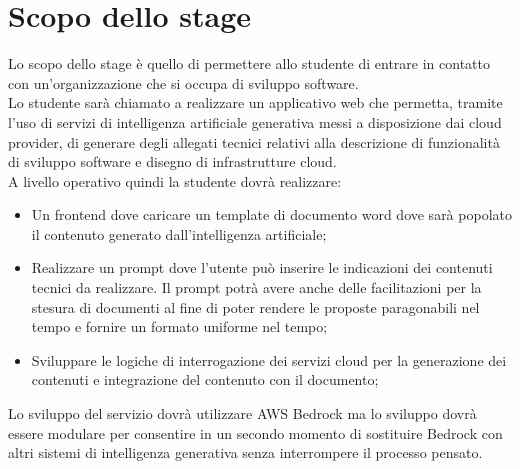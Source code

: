 \section*{Scopo dello stage}
Lo scopo dello stage è quello di permettere allo studente di entrare in contatto con un’organizzazione che si occupa di sviluppo software.\\

Lo studente sarà chiamato a realizzare un applicativo web che permetta, tramite l’uso di servizi di intelligenza artificiale generativa messi a disposizione dai cloud provider, di generare degli allegati tecnici relativi alla descrizione di funzionalità di sviluppo software e disegno di infrastrutture cloud. \\

A livello operativo quindi la studente dovrà realizzare:
\begin{itemize}
    \item Un frontend dove caricare un template di documento word dove sarà popolato il contenuto generato dall’intelligenza artificiale;
    \item Realizzare un prompt dove l’utente può inserire le indicazioni dei contenuti tecnici da realizzare. Il prompt potrà avere anche delle facilitazioni per la stesura di documenti al fine di poter rendere le proposte paragonabili nel tempo e fornire un formato uniforme nel tempo;
    \item Sviluppare le logiche di interrogazione dei servizi cloud per la generazione dei contenuti e integrazione del contenuto con il documento;
\end{itemize}


Lo sviluppo del servizio dovrà utilizzare AWS Bedrock ma lo sviluppo dovrà essere modulare per consentire in un secondo momento di sostituire Bedrock con altri sistemi di intelligenza generativa senza interrompere il processo pensato.



